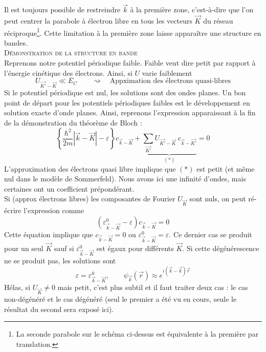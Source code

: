 	Il est toujours possible de restreindre $\vec k$ à la première zone, 
	c'est-à-dire que l'on peut centrer la parabole à électron libre en tous 
	les vecteurs $\vec{K}$ du réseau réciproque\footnote{La seconde parabole 
	sur le schéma ci-dessus est équivalente à la première par translation.}. 
	Cette limitation à la première zone laisse apparaître une structure en 
	bandes.\\
	
	\textsc{Démonstration de la structure en bande}\\
	Reprenons notre potentiel périodique faible. Faible veut dire petit par 
	rapport à l'énergie cinétique des électrons. Ainsi, si $U$ varie 
	faiblement 
	\begin{equation}
	U_{\vec{K'}-\vec{K}} \ll E_C\qquad\rightsquigarrow \quad\text{Appximation 
	des électrons quasi-libres}
	\end{equation}
	Si le potentiel périodique est nul, les solutions sont des ondes 
	planes. Un bon point de départ pour les potentiels périodiques 
	faibles est le développement en solution exacte d'onde planes. Ainsi,
	reprenons l'expression apparaissant à la fin de la démonstration du 
	théorème de Bloch : 
	\begin{equation}
	\left\{\frac{\hbar^2}{2m}|\vec{k}-\vec{K}|-\varepsilon\right\}c_{
	\vec{k}-\vec{K}}+\underbrace{\sum_{\vec{K'}}U_{\vec{K'}-\vec{K}}\ 
	c_{\vec{k}-\vec{K'}	}}_{(*)}=0
	\end{equation}	
	L'approximation des électrons quasi libre implique que $(*)$ est 
	petit (et même nul dans le modèle de Sommerfeld). Nous avons ici une 
	infinité d'ondes, mais certaines ont un coefficient prépondérant.\\
	Si (approx électrons libres) les composantes de Fourier $U_{\vec{K}}$ 
	sont nuls, on peut ré-écrire l'expression comme
	\begin{equation}
	\left(\varepsilon_{\vec{k}-\vec{K}}^0 - \varepsilon\right)c_{\vec{k}
	-\vec{K}} = 0
	\end{equation}
	Cette équation implique que $c_{\vec{k}-\vec{K}}=0$ ou $\varepsilon_{\vec{k}
	-\vec{K}}^0 = \varepsilon$. Ce dernier cas se produit pour un seul $\vec{K}$ 
	sauf si $\varepsilon_{\vec{k}-\vec{K}}^0$ est égaux pour différents $\vec K$. 
	Si cette dégénérescence ne se produit pas, les solutions sont
	\begin{equation}
	\varepsilon = \varepsilon_{\vec{k}-\vec{K}}^0,\qquad \psi_{\vec{k}}(\vec{r})
	\approx e^{i(\vec{k}-\vec k)\vec{r}}
	\end{equation}
	Hélas, si $U_{\vec{K}} \neq 0$ mais petit, c'est plus subtil et il faut 
	traiter deux cas : le cas non-dégénéré et le cas dégénéré (seul le premier 
	a été vu en cours, seule le résultat du second sera exposé ici).

